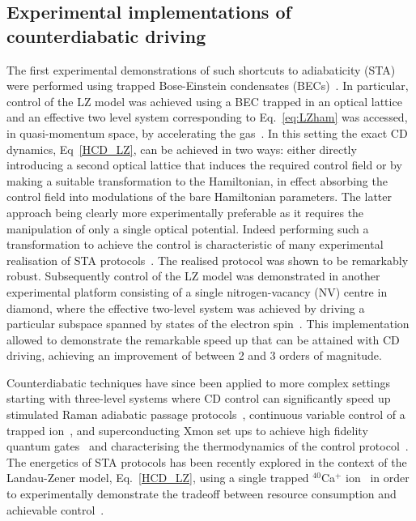 \subsection{Experimental implementations of counterdiabatic driving}
The first experimental demonstrations of such shortcuts to adiabaticity (STA) were performed using trapped Bose-Einstein condensates (BECs)~\cite{STAExp2011, CDExp2012}. In particular, control of the LZ model was achieved using a BEC trapped in an optical lattice and an effective two level system corresponding to Eq.~\eqref{eq:LZham} was accessed, in quasi-momentum space, by accelerating the gas~\cite{CDExp2012}. In this setting the exact CD dynamics, Eq~\eqref{HCD_LZ}, can be achieved in two ways: either directly introducing a second optical lattice that induces the required control field or by making a suitable transformation to the Hamiltonian, in effect absorbing the control field into modulations of the bare Hamiltonian parameters. The latter approach being clearly more experimentally preferable as it requires the manipulation of only a single optical potential. Indeed performing such a transformation to achieve the control is characteristic of many experimental realisation of STA protocols~\cite{CDExp2016a, CDExp2016b, CDExp2017}. The realised protocol was shown to be remarkably robust. Subsequently control of the LZ model was demonstrated in another experimental platform consisting of a single nitrogen-vacancy (NV) centre in diamond, where the effective two-level system was achieved by driving a particular subspace spanned by states of the electron spin~\cite{CDExp2013}. This implementation allowed to demonstrate the remarkable speed up that can be attained with CD driving, achieving an improvement of between 2 and 3 orders of magnitude. 

Counterdiabatic techniques have since been applied to more complex settings starting with three-level systems where CD control can significantly speed up stimulated Raman adiabatic passage protocols~\cite{CDExp2016a, CDExp2017, CDExp2022}, continuous variable control of a trapped ion~\cite{CDExp2016b}, and superconducting Xmon set ups to achieve high fidelity quantum gates~\cite{CDExp2018a} and characterising the thermodynamics of the control protocol~\cite{CDExp2018b}. The energetics of STA protocols has been recently explored in the context of the Landau-Zener model, Eq.~\eqref{HCD_LZ}, using a single trapped $^{40}$Ca$^+$ ion~\cite{STAExp2024} in order to experimentally demonstrate the tradeoff between resource consumption and achievable control~\cite{CampbellDeffnerPRL}.

